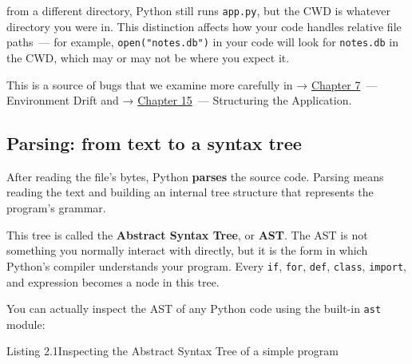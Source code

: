 \noindent{}from a different directory, Python still runs \texttt{app.py}, but the CWD is whatever directory you were in. This distinction affects how your code handles relative file paths~--- for example, \texttt{open("notes.db")} in your code will look for \texttt{notes.db} in the CWD, which may or may not be where you expect it.

This is a source of bugs that we examine more carefully in → \hyperref[ch:07-environment-drift]{Chapter 7}~--- Environment Drift and → \hyperref[ch:15-structuring-the-application]{Chapter 15}~--- Structuring the Application.

\subsection*{Parsing: from text to a syntax tree}\label{02-runtime-initialization:parsing-from-text-to-a-syntax-tree}

After reading the file's bytes, Python \textbf{parses} the source code. Parsing means reading the text and building an internal tree structure that represents the program's grammar.

This tree is called the \textbf{Abstract Syntax Tree}, or \textbf{AST}. The AST is not something you normally interact with directly, but it is the form in which Python's compiler understands your program. Every \texttt{if}, \texttt{for}, \texttt{def}, \texttt{class}, \texttt{import}, and expression becomes a node in this tree.

You can actually inspect the AST of any Python code using the built-in \texttt{ast} module:

\begin{codeboxcap}[short]{\textcolor{accent}{Listing 2.1}\enspace Inspecting the Abstract Syntax Tree of a simple program}

\begin{Shaded}
\begin{Highlighting}[]

\OperatorTok{=} 

\OperatorTok{=}
\OperatorTok{=}\NormalTok{))}
\end{Highlighting}
\end{Shaded}

\end{codeboxcap}

